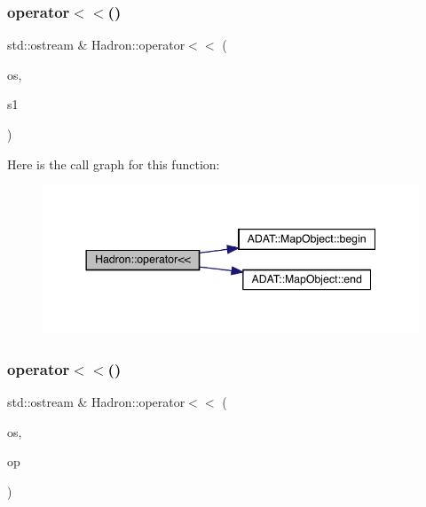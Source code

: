 \subsubsection{\texorpdfstring{operator$<$$<$()}{operator<<()}\hspace{0.1cm}{\footnotesize\ttfamily [41/48]}}
{\footnotesize\ttfamily std\+::ostream \& Hadron\+::operator$<$$<$ (\begin{DoxyParamCaption}\item[{std\+::ostream \&}]{os,  }\item[{const \mbox{\hyperlink{namespaceHadron_a22279e56b59508dc8dd2c8991dc911fd}{Map\+Single\+Hadron\+Quark\+Spin\+\_\+t}} \&}]{s1 }\end{DoxyParamCaption})}

Here is the call graph for this function\+:
\nopagebreak
\begin{figure}[H]
\begin{center}
\leavevmode
\includegraphics[width=344pt]{d1/daf/namespaceHadron_af9e168289a71f406cf53d10783cc513c_cgraph}
\end{center}
\end{figure}
\mbox{\label{namespaceHadron_af6547a2cdd6369eda030067e469096bf}} 
\subsubsection{\texorpdfstring{operator$<$$<$()}{operator<<()}\hspace{0.1cm}{\footnotesize\ttfamily [42/48]}}
{\footnotesize\ttfamily std\+::ostream \& Hadron\+::operator$<$$<$ (\begin{DoxyParamCaption}\item[{std\+::ostream \&}]{os,  }\item[{const \mbox{\hyperlink{structHadron_1_1SingleHadronQuarkDeriv__t}{Single\+Hadron\+Quark\+Deriv\+\_\+t}} \&}]{op }\end{DoxyParamCaption})}

